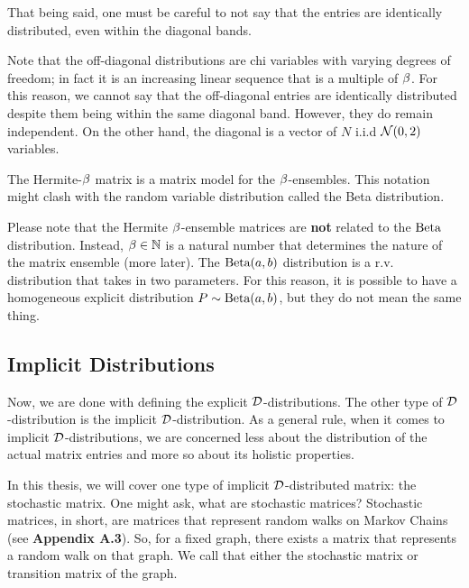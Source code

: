 That being said, one must be careful to not say that the entries are identically distributed, even within the diagonal bands.

\begin{remark}
Note that the off-diagonal distributions are chi variables with varying degrees of freedom; in fact it is an increasing linear sequence that is a multiple of $\b$.
For this reason, we cannot say that the off-diagonal entries are identically distributed despite them being within the same diagonal band. However, they do remain independent.
On the other hand, the diagonal is a vector of $N$ i.i.d $\mathcal{N}(0,2)$ variables.
\end{remark}

The Hermite-$\b$ matrix is a matrix model for the $\b$-ensembles. This notation might clash with the random variable distribution called the Beta distribution.

\begin{warning}[$\b$-Notation]
Please note that the Hermite $\b$-ensemble matrices are \textbf{not} related to the $\text{Beta}$ distribution.
Instead, $\beta \in \mathbb{N}$ is a natural number that determines the nature of the matrix ensemble (more later). The $\text{Beta}(a,b)$ distribution is a r.v. distribution that
takes in two parameters. For this reason, it is possible to have a homogeneous explicit distribution $P \sim \text{Beta}(a,b)$, but they do not mean the same thing.
\end{warning}


\newpage
\subsection{Implicit Distributions}

Now, we are done with defining the explicit $\mathcal{D}$-distributions. The other type of $\mathcal{D}$-distribution is the implicit $\mathcal{D}$-distribution.
As a general rule, when it comes to implicit $\mathcal{D}$-distributions, we are concerned less about the distribution of the actual matrix entries and more so about its holistic properties.

In this thesis, we will cover one type of implicit $\mathcal{D}$-distributed matrix: the stochastic matrix. One might ask, what are stochastic matrices?
Stochastic matrices, in short, are matrices that represent random walks on Markov Chains (see \textbf{Appendix A.3}). So, for a fixed graph, there exists a matrix that represents a random walk on that graph.
We call that either the stochastic matrix or transition matrix of the graph.

